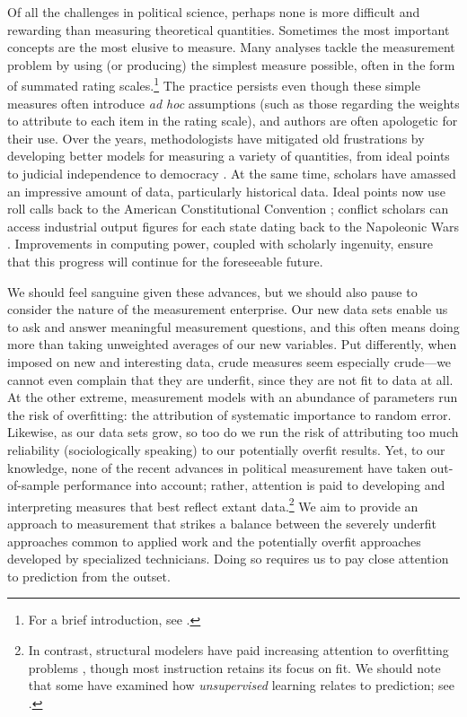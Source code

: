 
Of all the challenges in political science, perhaps none is more difficult and rewarding than measuring theoretical quantities.
Sometimes the most important concepts are the most elusive to measure.
Many analyses tackle the measurement problem by using (or producing) the simplest measure possible, often in the form of summated rating scales.\footnote{For a brief introduction, see \citet{spector2006}.}
The practice persists even though these simple measures often introduce \emph{ad hoc} assumptions (such as those regarding the weights to attribute to each item in the rating scale), and authors are often apologetic for their use.
Over the years, methodologists have mitigated old frustrations by developing better models for measuring a variety of quantities, from ideal points \citep{clinton2004} to judicial independence \citep{linzer2014} to democracy \citep{jackman2008}.
At the same time, scholars have amassed an impressive amount of data, particularly historical data.
Ideal points now use roll calls back to the American Constitutional Convention \citep{heckelman2013}; conflict scholars can access industrial output figures for each state dating back to the Napoleonic Wars \citep{singer1972}.
Improvements in computing power, coupled with scholarly ingenuity, ensure that this progress will continue for the foreseeable future.

We should feel sanguine given these advances, but we should also pause to consider the nature of the measurement enterprise.
Our new data sets enable us to ask and answer meaningful measurement questions, and this often means doing more than taking unweighted averages of our new variables.
Put differently, when imposed on new and interesting data, crude measures seem especially crude---we cannot even complain that they are underfit, since they are not fit to data at all.
At the other extreme, measurement models with an abundance of parameters run the risk of overfitting: the attribution of systematic importance to random error.
Likewise, as our data sets grow, so too do we run the risk of attributing too much reliability (sociologically speaking) to our potentially overfit results.
Yet, to our knowledge, none of the recent advances in political measurement have taken out-of-sample performance into account; rather, attention is paid to developing and interpreting measures that best reflect extant data.\footnote{In contrast, structural modelers have paid increasing attention to overfitting problems \citep{pitt2002,preacher2006}, though most instruction retains its focus on fit.  We should note that some have examined how \emph{unsupervised} learning relates to prediction; see \citet{tibshirani2005}.}
We aim to provide an approach to measurement that strikes a balance between the severely underfit approaches common to applied work and the potentially overfit approaches developed by specialized technicians.
Doing so requires us to pay close attention to prediction from the outset.

